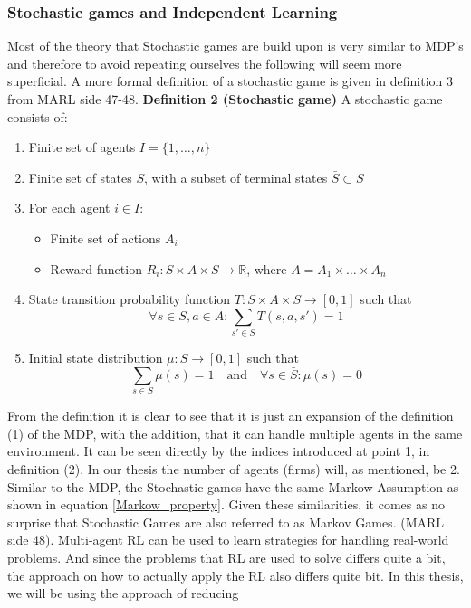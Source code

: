 \documentclass{article}
\begin{document}
\subsubsection{Stochastic games and Independent Learning}
Most of the theory that Stochastic games are build upon is very similar to MDP's and therefore to avoid repeating ourselves the following will seem more superficial. A more formal definition of a stochastic game is given in definition 3 from MARL side 47-48. 
\newline
\textbf{Definition 2 (Stochastic game)} A stochastic game consists of:
\begin{enumerate}
    \item Finite set of agents \( I = \{1, \dots, n\} \)
    \item Finite set of states \( S \), with a subset of terminal states \( \bar{S} \subset S \)
    \item For each agent \( i \in I \):
    \begin{itemize}
        \item Finite set of actions \( A_i \)
        \item Reward function \( R_i: S \times A \times S\to \mathbb{R} \), where \( A = A_1 \times \dots \times A_n \)
    \end{itemize}
    \item State transition probability function \( T: S \times A \times S \to [0, 1] \) such that
    \[
    \forall s \in S, a \in A : \sum_{s' \in S} T(s, a, s') = 1
    \]
    \item Initial state distribution \( \mu: S \to [0, 1] \) such that
    \[
    \sum_{s \in S} \mu(s) = 1 \quad \text{and} \quad \forall s \in \bar{S}: \mu(s) = 0
    \]
\end{enumerate}
From the definition it is clear to see that it is just an expansion of the definition (1) of the MDP, with the addition, that it can handle multiple agents in the same environment. It can be seen directly by the indices introduced at point 1, in definition (2). In our thesis the number of agents (firms) will, as mentioned, be 2. Similar to the MDP, the Stochastic games have the same Markow Assumption as shown in equation \ref{Markow_property}. Given these similarities, it comes as no surprise that Stochastic Games are also referred to as Markov Games. (MARL side 48).
\newline 
\newline
Multi-agent RL can be used to learn strategies for handling real-world problems. And since the problems that RL are used to solve differs quite a bit, the approach on how to actually apply the RL also differs quite bit. In this thesis, we will be using the approach of reducing 
\end{document}
